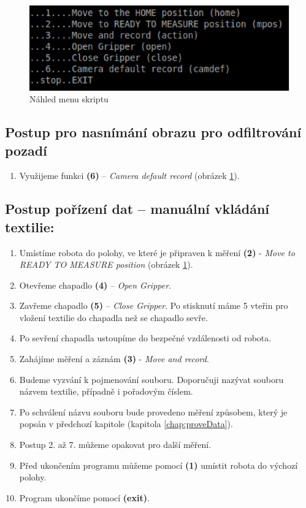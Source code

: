 \documentclass[10pt,a4paper,titlepage,oneside]{report}
\begin{document}
\begin{figure}[H]
	\centering  	
  	\includegraphics[scale=0.6]{pictures/obrazek3.eps}
  	\caption{Náhled menu skriptu}
  	\label{fig:menu}
\end{figure}

\subsection{Postup pro nasnímání obrazu pro odfiltrování pozadí}
\begin{enumerate}
  \item Využijeme funkci \textbf{(6)} – \textit{Camera default record} (obrázek \ref{fig:menu}).
\end{enumerate}

\subsection{Postup pořízení dat – manuální vkládání textilie:}
\begin{enumerate}
  \item Umístíme robota do polohy, ve které je připraven k měření \textbf{(2)} - \textit{Move to READY TO MEASURE position} (obrázek \ref{fig:menu}).
  \item Otevřeme chapadlo \textbf{(4)} – \textit{Open Gripper}.
  \item Zavřeme chapadlo \textbf{(5)} – \textit{Close Gripper}. Po stisknutí máme 5 vteřin pro vložení textilie do chapadla než se chapadlo sevře.
  \item Po sevření chapadla ustoupíme do bezpečné vzdálenosti od robota.
  \item Zahájíme měření a záznám \textbf{(3)} - \textit{Move and record}.
  \item Budeme vyzvání k pojmenování souboru. Doporučuji nazývat souboru názvem textilie, případně i pořadovým číslem.
  \item Po schválení názvu souboru bude provedeno měření způsobem, který je popsán v předchozí kapitole  (kapitola \ref{chap:proveData}).
  \item Postup 2. až 7. můžeme opakovat pro další měření.
  \item Před ukončením programu můžeme pomocí \textbf{(1)} umístit robota do výchozí polohy.
  \item Program ukončíme pomocí \textbf{(exit)}.
\end{enumerate}
\end{document}
